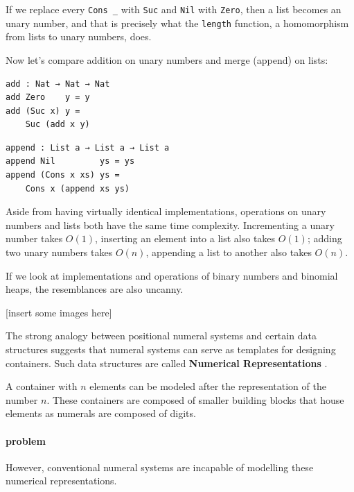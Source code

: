 \documentclass[../thesis.tex]{subfiles}
\begin{document}
If we replace every {\lstinline|Cons _|} with {\lstinline|Suc|} and {\lstinline|Nil|}
with {\lstinline|Zero|}, then a list becomes an unary number,
and that is precisely what the {\lstinline|length|} function,
a homomorphism from lists to unary numbers, does.

Now let's compare addition on unary numbers and merge (append) on lists:

\noindent\begin{minipage}{.48\textwidth}
\begin{lstlisting}[basicstyle=\ttfamily\scriptsize]
add : Nat → Nat → Nat
add Zero    y = y
add (Suc x) y =
    Suc (add x y)
\end{lstlisting}
\end{minipage}\hfill
\begin{minipage}{.45\textwidth}
\begin{lstlisting}[basicstyle=\ttfamily\scriptsize]
append : List a → List a → List a
append Nil         ys = ys
append (Cons x xs) ys =
    Cons x (append xs ys)
\end{lstlisting}
\end{minipage}

Aside from having virtually identical implementations, operations on unary numbers
and lists both have the same time complexity. Incrementing a unary number takes
$ O(1) $, inserting an element into a list also takes $ O(1) $; adding two unary
numbers takes $ O(n) $, appending a list to another also takes $ O(n) $.

If we look at implementations and operations of binary numbers and binomial
heaps, the resemblances are also uncanny.

[insert some images here]

The strong analogy between positional numeral systems and certain data structures
suggests that numeral systems can serve as templates for designing containers.
Such data structures are called \textbf{Numerical Representations}\cite{okasaki1996purely}
\cite{hinze1998numerical}.

A container with $ n $ elements can be modeled after the representation of the number $ n $.
These containers are composed of smaller building blocks that house elements
as numerals are composed of digits.

\paragraph{problem}
However, conventional numeral systems are incapable of modelling these numerical
representations.
\end{document}
